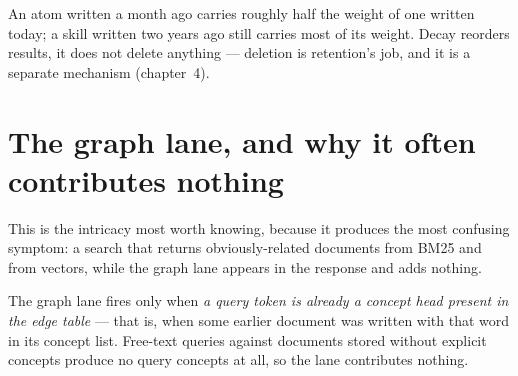 \begin{center}
\end{center}

An atom written a month ago carries roughly half the weight of one written today; a skill written
two years ago still carries most of its weight. Decay reorders results, it does not delete
anything --- deletion is retention's job, and it is a separate mechanism (chapter~4).

\section{The graph lane, and why it often contributes nothing}

This is the intricacy most worth knowing, because it produces the most confusing symptom: a search
that returns obviously-related documents from BM25 and from vectors, while the graph lane appears
in the response and adds nothing.

The graph lane fires only when \emph{a query token is already a concept head present in the edge
table} --- that is, when some earlier document was written with that word in its concept list.
Free-text queries against documents stored without explicit concepts produce no query concepts at
all, so the lane contributes nothing.

